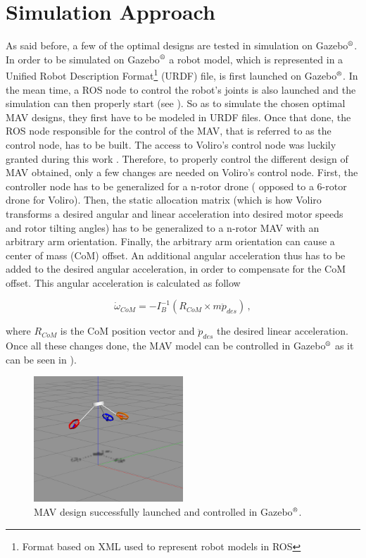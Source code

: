 \section{Simulation Approach}
\label{sec:control_approach}
As said before, a few of the optimal designs are tested in simulation on
Gazebo$^\textrm{\textregistered}$. In order to be simulated on
Gazebo$^\textrm{\textregistered}$ a robot model, which is represented
in a Unified Robot Description Format\footnote{Format based on XML used
to represent robot models in ROS} (URDF) file, is first launched on
Gazebo$^\textrm{\textregistered}$. In the mean time, a ROS node to control
the robot’s joints is also launched and the simulation can then properly start
(see ).
So as to simulate the chosen optimal MAV designs, they first have to be
modeled in URDF files. Once that done, the ROS node responsible for the
control of the MAV, that is referred to as the control node, has to be built.
The access to Voliro’s control node was luckily granted during this work
 \citep{kamel_voliro:_2018}. Therefore, to properly control the different
design of MAV obtained, only a few changes are needed on Voliro’s control
node. First, the controller node has to be generalized for a n-rotor drone (
opposed to a 6-rotor drone for Voliro). Then, the static allocation matrix
(which is how Voliro transforms a desired angular and linear acceleration into
desired motor speeds and rotor tilting angles)
has to be generalized to a n-rotor MAV with an arbitrary arm orientation.
Finally, the arbitrary arm orientation can cause a center of mass (CoM)
offset. An additional angular acceleration thus has to be added to the desired
angular acceleration, in order to compensate for the CoM offset. This
angular acceleration is calculated as follow

\begin{equation}
  \label{com_offset}
	\dot{\omega}_{CoM} = -I_B^{-1}(R_{CoM}\times m\ddot{p}_{des})\, ,
\end{equation}

where $R_{CoM}$ is the CoM position vector and $\ddot{p}_{des}$ the desired
linear acceleration.\\
Once all these changes done, the MAV model can be controlled in
Gazebo$^\textrm{\textregistered}$ as it can be seen in ).

\begin{figure}[!h]
  \centering
  \includegraphics[width=0.5\textwidth]{images/sim_gazebo.png}
  \caption{MAV design successfully launched and controlled in Gazebo$^\textrm{\textregistered}$.}
  \label{fig:sim_gazebo}
\end{figure}

